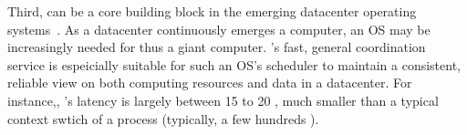 % 


Third, \xxx can be a core building block in the emerging datacenter operating 
systems~\cite{hotos15, mesos, web-article}. As a datacenter continuously 
emerges a computer, an OS may be increasingly needed for thus a giant 
computer. \xxx's fast, general coordination service is espeicially suitable 
for such an OS's scheduler to maintain a consistent, reliable view on both 
computing resources and data in a datacenter. For instance,, \xxx's latency is 
largely between 15 to 20 \us, much smaller than a typical context swtich of a 
process (typically, a few hundreds \us).

% 
% 

